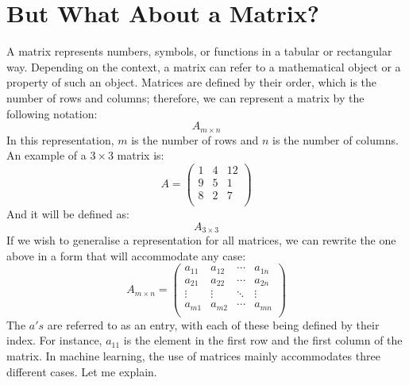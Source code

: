 \documentclass[600paper, 11pt,twoside,openany]{kdp}
\begin{document}
\chapter{But What About a Matrix?}
\par 
\vspace{-3pt}
\indent A matrix represents numbers, symbols, or functions in a tabular or rectangular way. Depending on the context, a matrix can refer to a mathematical object or a property of such an object. Matrices are defined by their order, which is the number of rows and columns; therefore, we can represent a matrix by the following notation:
\[ A_{m\times n}\]
\indent In this representation, $m$ is the number of rows and $n$ is the number of columns. An example of a $3 \times 3$ matrix is:
\[ A =
\begin{pmatrix}
1 & 4 & 12\\
9 & 5 & 1 \\
8 & 2 & 7 \\
\end{pmatrix}
\]
\indent And it will be defined as:
\[ A_{3\times 3}\]
\indent If we wish to generalise a representation for all matrices, we can rewrite the one above in a form that will accommodate any case:
\[ A_{m\times n} = 
\begin{pmatrix}
a_{11} & a_{12} & \cdots & a_{1n}\\
a_{21} & a_{22} & \cdots & a_{2n}\\
\vdots & \vdots & \ddots & \vdots\\
a_{m1} & a_{m2} & \cdots & a_{mn}\\
\end{pmatrix}
\]
\indent The $a's$ are referred to as an entry, with each of these being defined by their index. For instance, $a_{11}$ is the element in the first row and the first column of the matrix. In machine learning, the use of matrices mainly accommodates three different cases. Let me explain.
\end{document}
